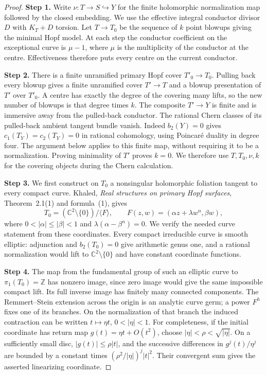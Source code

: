 \begin{proof}
\noindent\textbf{Step 1.} Write $\nu:T\to S\hookrightarrow Y$ for the finite
holomorphic normalization map followed by the closed
embedding. We use the effective integral conductor
divisor $D$ with $K_T+D$ torsion. Let $T\to T_0$
be the sequence of $k$ point blowups giving the
minimal Hopf model. At each step the conductor
coefficient on the exceptional curve is $\mu-1$,
where $\mu$ is the multiplicity of the conductor
at the centre. Effectiveness therefore puts every
centre on the current conductor.

\noindent\textbf{Step 2.} There is a finite unramified primary Hopf cover
$T'_0\to T_0$. Pulling back every blowup gives a
finite unramified cover $T'\to T$ and a blowup
presentation of $T'$ over $T'_0$. A centre has
exactly the degree of the covering many lifts,
so the new number of blowups is that degree times
$k$. The composite $T'\to Y$ is finite and is
immersive away from the pulled-back conductor.
The rational Chern classes of its pulled-back
ambient tangent bundle vanish. Indeed $b_2(Y)=0$
gives $c_1(T_Y)=c_2(T_Y)=0$ in rational cohomology,
using Poincar\'e duality in degree four. The
argument below applies to this finite map, without
requiring it to be a normalization. Proving
minimality of $T'$ proves $k=0$. We therefore use
$T,T_0,\nu,k$ for the covering objects during the
Chern calculation.

\noindent\textbf{Step 3.} We first construct on $T_0$ a nonsingular
holomorphic foliation tangent to every compact
curve. Khaled, \emph{Real structures on primary
Hopf surfaces}, Theorem~2.1(1) and formula~(1),
gives
\[
 T_0=(\mathbb C^2\setminus\{0\})/\langle F\rangle,
 \qquad F(z,w)=(\alpha z+\lambda w^n,\beta w),
\]
where $0<|\alpha|\le|\beta|<1$ and
$\lambda(\alpha-\beta^n)=0$. We verify the needed
curve statement from these coordinates. Every
compact irreducible curve is smooth elliptic:
adjunction and $b_2(T_0)=0$ give arithmetic genus
one, and a rational normalization would lift to
$\mathbb C^2\setminus\{0\}$ and have constant
coordinate functions.

\noindent\textbf{Step 4.} The map from the fundamental group of such an
elliptic curve to $\pi_1(T_0)=\mathbb Z$ has
nonzero image, since zero image would give the
same impossible compact lift. Its full inverse
image has finitely many connected components.
The Remmert--Stein extension across the origin
is an analytic curve germ; a power $F^h$ fixes
one of its branches. On the normalization of
that branch the induced contraction can be
written $t\mapsto\eta t$, $0<|\eta|<1$.
For completeness, if the initial coordinate
has return map $g(t)=\eta t+O(t^2)$, choose
$|\eta|<\rho<\sqrt{|\eta|}$. On a sufficiently
small disc, $|g(t)|\le\rho|t|$, and the
successive differences in $g^j(t)/\eta^j$
are bounded by a constant times
$(\rho^2/|\eta|)^j|t|^2$. Their convergent sum
gives the asserted linearizing coordinate.


\end{proof}
